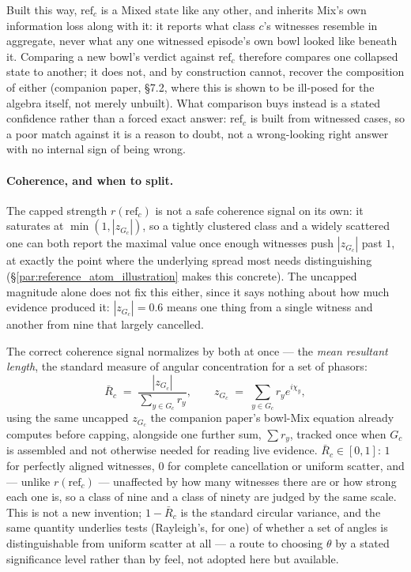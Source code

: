 \documentclass[12pt, a4paper]{article}
\begin{document}
Built this way, $\mathrm{ref}_c$ is a Mixed state like any other, and
inherits Mix's own information loss along with it: it reports what
class $c$'s witnesses resemble in aggregate, never what any one
witnessed episode's own bowl looked like beneath it. Comparing a new
bowl's verdict against $\mathrm{ref}_c$ therefore compares one
collapsed state to another; it does not, and by construction cannot,
recover the composition of either (companion paper, \S7.2, where
this is shown to be ill-posed for the algebra itself, not merely
unbuilt). What comparison buys instead is a stated confidence rather
than a forced exact answer: $\mathrm{ref}_c$ is built from witnessed
cases, so a poor match against it is a reason to doubt, not a
wrong-looking right answer with no internal sign of being wrong.

\paragraph{Coherence, and when to split.}
The capped strength $r(\mathrm{ref}_c)$ is not a safe coherence
signal on its own: it saturates at $\min(1,|z_{G_c}|)$, so a tightly
clustered class and a widely scattered one can both report the
maximal value once enough witnesses push $|z_{G_c}|$ past $1$, at
exactly the point where the underlying spread most needs
distinguishing (\S\ref{par:reference_atom_illustration} makes this
concrete). The uncapped magnitude alone does not fix this either,
since it says nothing about how much evidence produced it: $|z_{G_c}|
= 0.6$ means one thing from a single witness and another from nine
that largely cancelled.

The correct coherence signal normalizes by both at once --- the
\emph{mean resultant length}, the standard measure of angular
concentration for a set of phasors:
\begin{equation}
    \bar R_c \;=\; \frac{|z_{G_c}|}{\sum_{y\in G_c} r_y},
    \qquad
    z_{G_c} \;=\; \sum_{y\in G_c} r_y e^{i\chi_y},
    \label{eq:coherence}
\end{equation}
using the same uncapped $z_{G_c}$ the companion paper's bowl-Mix
equation already computes before capping, alongside one further sum,
$\sum r_y$, tracked once when $G_c$ is assembled and not otherwise
needed for reading live evidence. $\bar R_c\in[0,1]$: $1$ for
perfectly aligned witnesses, $0$ for complete cancellation or uniform
scatter, and --- unlike $r(\mathrm{ref}_c)$ --- unaffected by how many
witnesses there are or how strong each one is, so a class of nine and
a class of ninety are judged by the same scale. This is not a new
invention; $1-\bar R_c$ is the standard circular variance, and the
same quantity underlies tests (Rayleigh's, for one) of whether a set
of angles is distinguishable from uniform scatter at all --- a route
to choosing $\theta$ by a stated significance level rather than by
feel, not adopted here but available.
\end{document}
